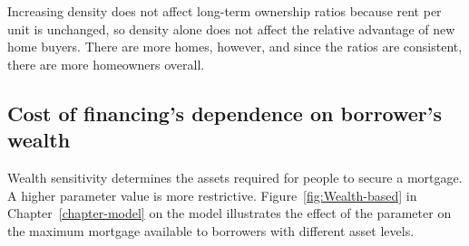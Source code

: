 Increasing density does not affect long-term ownership ratios because rent per unit is unchanged, so density alone does not affect the relative advantage of new home buyers. %
There are more homes, however, and since the ratios are consistent, there are more homeowners overall. %

\newpage

\subsection{Cost of financing's dependence on borrower's wealth}

Wealth sensitivity %
determines the assets required for people to secure a mortgage. A higher parameter value is more restrictive. Figure~\ref{fig:Wealth-based} in Chapter~\ref{chapter-model} on the model illustrates the effect of the parameter on the maximum mortgage available to borrowers with different asset levels.%

